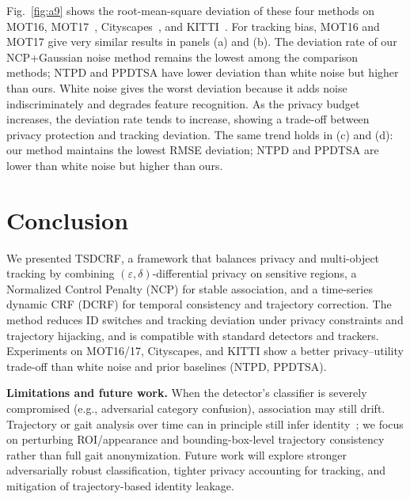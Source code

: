 \documentclass[trans]{IEEEtran}
\begin{document}
Fig.~\ref{fig:a9} shows the root-mean-square deviation of these four methods on MOT16, MOT17~\cite{milan2016mot16}, Cityscapes~\cite{cordts2016cityscapes}, and KITTI~\cite{geiger2013vision}. For tracking bias, MOT16 and MOT17 give very similar results in panels (a) and (b). The deviation rate of our NCP+Gaussian noise method remains the lowest among the comparison methods; NTPD and PPDTSA have lower deviation than white noise but higher than ours. White noise gives the worst deviation because it adds noise indiscriminately and degrades feature recognition. As the privacy budget increases, the deviation rate tends to increase, showing a trade-off between privacy protection and tracking deviation. The same trend holds in (c) and (d): our method maintains the lowest RMSE deviation; NTPD and PPDTSA are lower than white noise but higher than ours.


\section{Conclusion}
We presented TSDCRF, a framework that balances privacy and multi-object tracking by combining $(\varepsilon,\delta)$-differential privacy on sensitive regions, a Normalized Control Penalty (NCP) for stable association, and a time-series dynamic CRF (DCRF) for temporal consistency and trajectory correction. The method reduces ID switches and tracking deviation under privacy constraints and trajectory hijacking, and is compatible with standard detectors and trackers. Experiments on MOT16/17, Cityscapes, and KITTI show a better privacy--utility trade-off than white noise and prior baselines (NTPD, PPDTSA).

\textbf{Limitations and future work.} When the detector's classifier is severely compromised (e.g., adversarial category confusion), association may still drift. Trajectory or gait analysis over time can in principle still infer identity~\cite{munsell2012person,andersson2015person,wu2017comprehensive,kusakunniran2013new}; we focus on perturbing ROI/appearance and bounding-box-level trajectory consistency rather than full gait anonymization. Future work will explore stronger adversarially robust classification, tighter privacy accounting for tracking, and mitigation of trajectory-based identity leakage.




\end{document}

